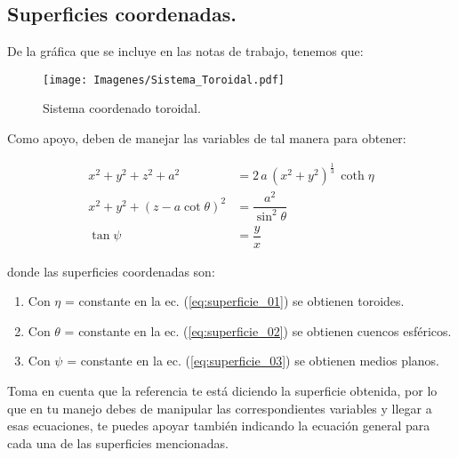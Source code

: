 \subsection{Superficies coordenadas.}

De la gráfica que se incluye en las notas de trabajo, tenemos que:

\begin{figure}[H]
    \centering
    \texttt{[image: Imagenes/Sistema\_Toroidal.pdf]}
    \caption{Sistema coordenado toroidal.}
\end{figure}

Como apoyo, deben de manejar las variables de tal manera para obtener:

\begin{align}
x^{2} + y^{2} + z^{2} + a^{2} &= 2 \, a \, (x^{2} + y^{2})^{\frac{1}{3}} \, \coth \eta \label{eq:superficie_01} \\[0.5em]
x^{2} + y^{2} + (z - a \cot \theta)^{2} &= \dfrac{a^{2}}{\sin^{2} \theta} \label{eq:superficie_02} \\[0.5em]
\tan \psi &= \dfrac{y}{x} \label{eq:superficie_03}
\end{align}

donde las superficies coordenadas son:
\begin{enumerate}
\item Con $\eta$ = constante en la ec. (\ref{eq:superficie_01}) se obtienen toroides.
\item Con $\theta$ = constante en la ec. (\ref{eq:superficie_02}) se obtienen cuencos esféricos.
\item Con $\psi$ = constante en la ec. (\ref{eq:superficie_03}) se obtienen medios planos.
\end{enumerate}

Toma en cuenta que la referencia te está diciendo la superficie obtenida, por lo que en tu manejo debes de manipular las correspondientes variables y llegar a esas ecuaciones, te puedes apoyar también indicando la ecuación general para cada una de las superficies mencionadas.

